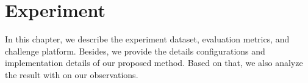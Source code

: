 \chapter{Experiment}
\label{chap-experiment} 
\begin{ChapAbstract}
In this chapter, we describe the experiment dataset, evaluation metrics, and challenge platform. Besides, we provide the details configurations and implementation details of our proposed method. Based on that, we also analyze the result with on our observations.
\end{ChapAbstract}






